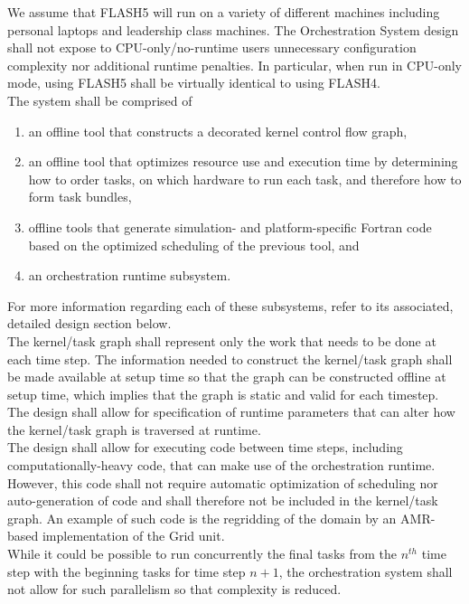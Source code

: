 \documentclass{article}
\begin{document}
We assume that FLASH5 will run on a variety of different machines including
personal laptops and leadership class machines.  The Orchestration System design
shall not expose to CPU-only/no-runtime users unnecessary configuration
complexity nor additional runtime penalties.  In particular, when run in
CPU-only mode, using FLASH5 shall be virtually identical to using FLASH4.\\

The system shall be comprised of
\begin{enumerate}
\item{an offline tool that constructs a decorated kernel control flow graph,}
\item{an offline tool that optimizes resource use and execution time by
determining how to order tasks, on which hardware to run each task, and
therefore how to form task bundles,}
\item{offline tools that generate simulation- and platform-specific Fortran code
based on the optimized scheduling of the previous tool, and}
\item{an orchestration runtime subsystem.}
\end{enumerate}
For more information regarding each of these subsystems, refer to its
associated, detailed design section below.\\

The kernel/task graph shall represent only the work that needs to be done at
each time step.  The information needed to construct the kernel/task graph shall
be made available at setup time so that the graph can be constructed offline at
setup time, which implies that the graph is static and valid for each
timestep.\\

The design shall allow for specification of runtime parameters that can alter
how the kernel/task graph is traversed at runtime.\\

The design shall allow for executing code between time steps, including
computationally-heavy code, that can make use of the orchestration runtime.
However, this code shall not require automatic optimization of scheduling nor
auto-generation of code and shall therefore not be included in the kernel/task
graph.  An example of such code is the regridding of the domain by an AMR-based
implementation of the Grid unit.\\

While it could be possible to run concurrently the final tasks from the $n^{th}$
time step with the beginning tasks for time step $n+1$, the orchestration
system shall not allow for such parallelism so that complexity is reduced.\\ 
\end{document}
